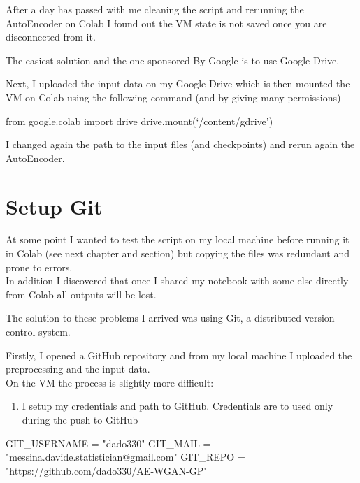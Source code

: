 \documentclass[
  letterpaper,
  DIV=11,
  numbers=noendperiod]{scrreprt}
\newenvironment{Shaded}{\begin{snugshade}}{\end{snugshade}}
\newcommand{\ImportTok}[1]{\textcolor[rgb]{0.00,0.46,0.62}{#1}}
\newcommand{\NormalTok}[1]{\textcolor[rgb]{0.00,0.23,0.31}{#1}}
\newcommand{\OperatorTok}[1]{\textcolor[rgb]{0.37,0.37,0.37}{#1}}
\newcommand{\StringTok}[1]{\textcolor[rgb]{0.13,0.47,0.30}{#1}}
\providecommand{\tightlist}{%
  \setlength{\itemsep}{0pt}\setlength{\parskip}{0pt}}\usepackage{longtable,booktabs,array}
\begin{document}
After a day has passed with me cleaning the script and rerunning the
AutoEncoder on Colab I found out the VM state is not saved once you are
disconnected from it.

The easiest solution and the one sponsored By Google is to use Google
Drive.

Next, I uploaded the input data on my Google Drive which is then mounted
the VM on Colab using the following command (and by giving many
permissions)

\begin{Shaded}
\begin{Highlighting}[]
\ImportTok{from}\NormalTok{ google.colab }\ImportTok{import}\NormalTok{ drive}
\NormalTok{drive.mount(‘}\OperatorTok{/}\NormalTok{content}\OperatorTok{/}\NormalTok{gdrive’)}
\end{Highlighting}
\end{Shaded}

I changed again the path to the input files (and checkpoints) and rerun
again the AutoEncoder.

\hypertarget{setup-git}{%
\chapter{Setup Git}\label{setup-git}}

At some point I wanted to test the script on my local machine before
running it in Colab (see next chapter and section) but copying the files
was redundant and prone to errors.\\
In addition I discovered that once I shared my notebook with some else
directly from Colab all outputs will be lost.

The solution to these problems I arrived was using Git, a distributed
version control system.

Firstly, I opened a GitHub repository and from my local machine I
uploaded the preprocessing and the input data.\\
On the VM the process is slightly more difficult:

\begin{enumerate}
\def\labelenumi{\arabic{enumi}.}
\tightlist
\item
  I setup my credentials and path to GitHub. Credentials are to used
  only during the push to GitHub
\end{enumerate}

\begin{Shaded}
\begin{Highlighting}[]
\NormalTok{GIT\_USERNAME }\OperatorTok{=} \StringTok{"dado330"}
\NormalTok{GIT\_MAIL }\OperatorTok{=} \StringTok{"messina.davide.statistician@gmail.com"}
\NormalTok{GIT\_REPO }\OperatorTok{=} \StringTok{"https://github.com/dado330/AE{-}WGAN{-}GP"}
\end{Highlighting}
\end{Shaded}
\end{document}
